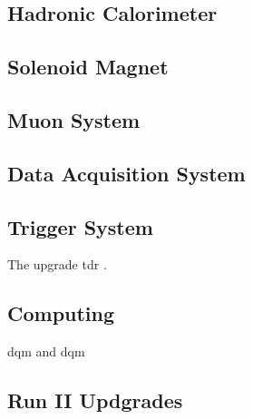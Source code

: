 \subsection{Hadronic Calorimeter}
\label{SUBSECTION:ExperimentalApparatus_CMS_HCAL}

\subsection{Solenoid Magnet}
\label{SUBSECTION:ExperimentalApparatus_CMS_Magnet}

\subsection{Muon System}
\label{SUBSECTION:ExperimentalApparatus_CMS_Mouns}

\subsection{Data Acquisition System}
\label{SUBSECTION:ExperimentalApparatus_CMS_DAQ}

\subsection{Trigger System}
\label{SUBSECTION:ExperimentalApparatus_CMS_Trigger}

The upgrade tdr \cite{CMSL1UpgradeTDR}.

\subsection{Computing}
\label{SUBSECTION:ExperimentalApparatus_CMS_Computing}

\gls{dqm} and \gls{dqm} 

\subsection{Run II Updgrades}
\label{SUBSECTION:ExperimentalApparatus_CMS_RUNII}

